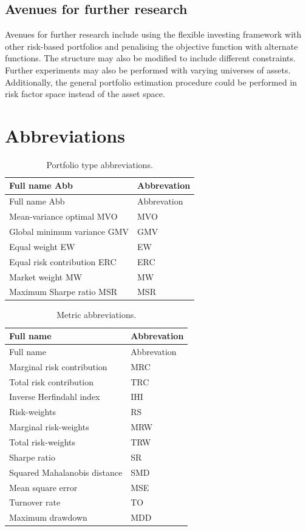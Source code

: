 \documentclass[
]{article}
\begin{document}
\hypertarget{avenues-for-further-research}{%
\subsection{Avenues for further research}\label{avenues-for-further-research}}

Avenues for further research include using the flexible investing framework with other risk-based
portfolios and penalising the objective function with alternate functions. The structure may also be
modified to include different constraints. Further experiments may also be performed with varying
universes of assets. Additionally, the general portfolio estimation procedure could be performed in
risk factor space instead of the asset space.

\hypertarget{appendix-appendix}{%
\appendix}


\hypertarget{abbreviations}{%
\section{Abbreviations}\label{abbreviations}}

\begin{longtable}[]{@{}ll@{}}
\caption{\label{tab:portabb} Portfolio type abbreviations.}\tabularnewline
\toprule
Full name \textbar{} Abb & Abbrevation \textbar{}\tabularnewline
\midrule
\endfirsthead
\toprule
Full name \textbar{} Abb & Abbrevation \textbar{}\tabularnewline
\midrule
\endhead
Mean-variance optimal \textbar{} MVO & MVO \textbar{}\tabularnewline
Global minimum variance \textbar{} GMV & GMV \textbar{}\tabularnewline
Equal weight \textbar{} EW & EW \textbar{}\tabularnewline
Equal risk contribution \textbar{} ERC & ERC \textbar{}\tabularnewline
Market weight \textbar{} MW & MW \textbar{}\tabularnewline
Maximum Sharpe ratio \textbar{} MSR & MSR \textbar{}\tabularnewline
\bottomrule
\end{longtable}

\begin{longtable}[]{@{}ll@{}}
\caption{\label{tab:metricabb} Metric abbreviations.}\tabularnewline
\toprule
Full name & Abbrevation \textbar{}\tabularnewline
\midrule
\endfirsthead
\toprule
Full name & Abbrevation \textbar{}\tabularnewline
\midrule
\endhead
Marginal risk contribution & MRC \textbar{}\tabularnewline
Total risk contribution & TRC \textbar{}\tabularnewline
Inverse Herfindahl index & IHI \textbar{}\tabularnewline
Risk-weights & RS \textbar{}\tabularnewline
Marginal risk-weights & MRW \textbar{}\tabularnewline
Total risk-weights & TRW \textbar{}\tabularnewline
Sharpe ratio & SR \textbar{}\tabularnewline
Squared Mahalanobis distance & SMD \textbar{}\tabularnewline
Mean square error & MSE \textbar{}\tabularnewline
Turnover rate & TO \textbar{}\tabularnewline
Maximum drawdown & MDD \textbar{}\tabularnewline
\bottomrule
\end{longtable}
\end{document}
